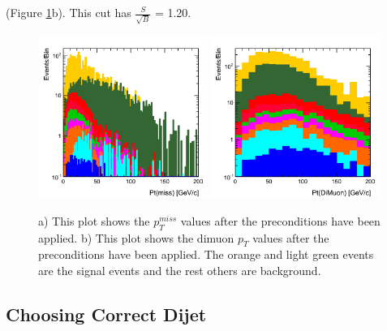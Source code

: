 \documentclass[12pt]{article}
\begin{document}
(Figure \ref{fig:ptmiss}b). This cut has $\frac{S}{\sqrt{B}}$ = 1.20.
\begin{figure}[!hbtp]
\begin{center}
    \includegraphics[width=0.49\textwidth]{images/Hist_PtMiss.png}
    \includegraphics[width=0.49\textwidth]{images/Hist_DiMuonPt.png}
    \caption{ \label{fig:ptmiss}
         a) This plot shows the $p^{miss}_{T}$ values after the preconditions have been applied. b) This plot shows the dimuon $p_{T}$ values 
	 after the preconditions have been applied. The orange and light green events are the signal events and the rest others are background.
      }
\end{center}
\end{figure} 


\subsection{Choosing Correct Dijet}
\end{document}
